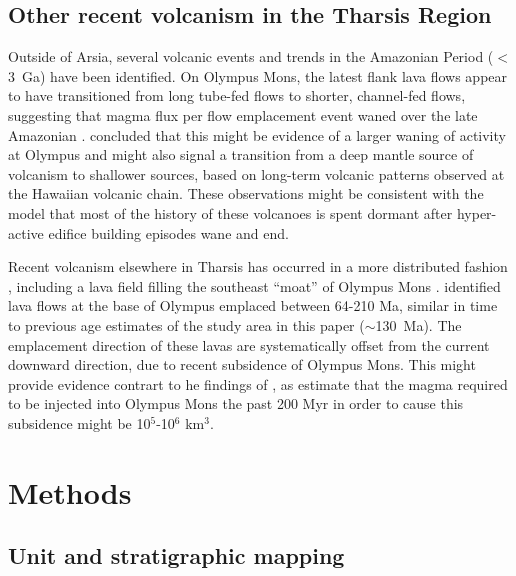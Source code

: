 \documentclass[12pt,letter]{article}
\begin{document}
\subsection{Other recent volcanism in the Tharsis Region}

Outside of Arsia, several volcanic events and trends in the Amazonian Period ($<$3~Ga) have been identified. On Olympus Mons, the latest flank lava flows appear to have transitioned from long tube-fed flows to shorter, channel-fed flows, suggesting that magma flux per flow emplacement event waned over the late Amazonian \citep{bleacher2007olympus}. \citet{bleacher2007olympus} concluded that this might be evidence of a larger waning of activity at Olympus and might also signal a transition from a deep mantle source of volcanism to shallower sources, based on long-term volcanic patterns observed at the Hawaiian volcanic chain. These observations might be consistent with the \citet{wilson2001evidence} model that most of the history of these volcanoes is spent dormant after hyper-active edifice building episodes wane and end.

Recent volcanism elsewhere in Tharsis has occurred in a more distributed fashion \citep{hauber2011very}, including a lava field filling the southeast ``moat'' of Olympus Mons \citep{chadwick2015late}. \citet{chadwick2015late} identified lava flows at the base of Olympus emplaced between 64-210 Ma, similar in time to previous age estimates of the study area in this paper ($\sim$130~Ma). The emplacement direction of these lavas are systematically offset from the current downward direction, due to recent subsidence of Olympus Mons. This might provide evidence contrart to he findings of \citet{bleacher2007olympus}, as \citet{chadwick2015late} estimate that the magma required to be injected into Olympus Mons the past 200 Myr in order to cause this subsidence might be 10$^5$-10$^6$ km$^3$.

\section{Methods}

\subsection{Unit and stratigraphic mapping}
\end{document}

